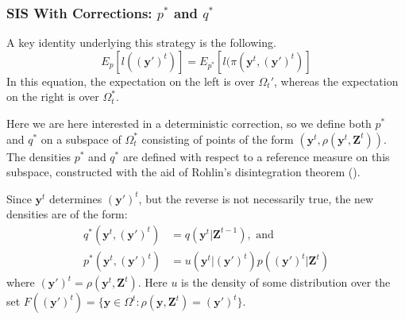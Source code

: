 \documentclass[9pt, xcolor={dvipsnames,svgnames,table}]{beamer}
\begin{document}
\begin{frame}
    \frametitle{SIS With Corrections: $p^*$ and $q^*$}
    A key identity underlying this strategy is the following.
    \begin{equation*}
        E_{p}[l(\bm{(y')}^{t})]  =  E_{p^*}[l(\pi (\bm{y}^{t}, \bm{(y')}^{t})]
    \end{equation*}
    In this equation, the expectation on the left is over $\Omega_t'$, whereas the expectation on the right is over $\Omega_t^*$.
    
    Here we are here interested in a deterministic correction, so we define both $p^*$ and $q^*$ on a subspace of $\Omega_t^*$ consisting of points of the form $(\bm{y}^{t}, \rho(\bm{y}^{t}, \bm{Z}^{t}))$. The densities $p^*$ and $q^*$ are defined with respect to a reference measure on this subspace, constructed with the aid of Rohlin's disintegration theorem (\cite{Rohlin}).
    
    Since $\bm{y}^{t}$ determines $\bm{(y')}^{t}$, but the reverse is not necessarily true, the new densities are of the form:
    \begin{align*}
        q^*(\bm{y}^{t},\bm{(y')}^{t}) &= q(\bm{y}^{t} | \bm{Z}^{t-1}), \mbox{ and } \\
        p^*(\bm{y}^{t},\bm{(y')}^{t}) &= u(\bm{y}^{t} | \bm{(y')}^{t}) p(\bm{(y')}^{t} | \bm{Z}^{t})
    \end{align*}
    where $\bm{(y')}^{t} = \rho(\bm{y}^{t}, \bm{Z}^{t})$. Here $u$ is the density of some distribution over the set $F(\bm{(y')}^{t}) = \{ \bm{y} \in \Omega^t  :  \rho(\bm{y}, \bm{Z}^{t}) = \bm{(y')}^{t}\}$.
\end{frame}
\end{document}
